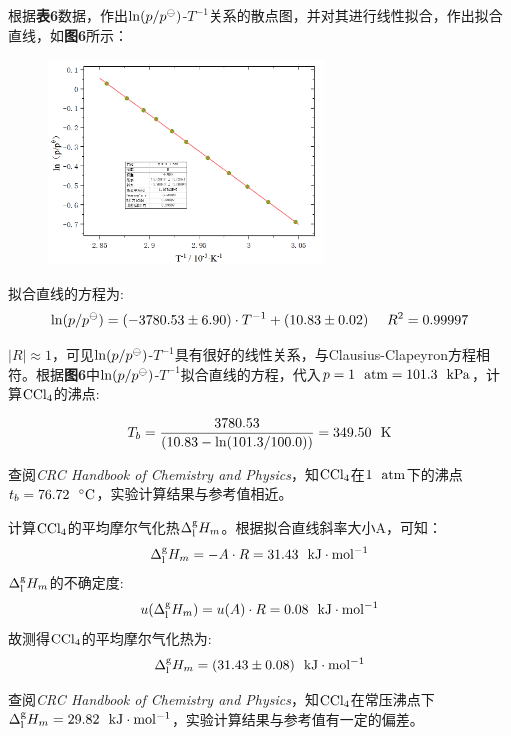 \documentclass[12pt]{article}
\begin{document}
		\par
		根据\textbf{表6}数据，作出${\rm ln}(p/p^{\ominus})$-$T^{-1}$关系的散点图，并对其进行线性拟合，作出拟合直线，如\textbf{图6}所示：
		\begin{figure}[!h]
			\centering
			\includegraphics[width=0.65\textwidth]{6.png}
		\end{figure}
		\par
		拟合直线的方程为:
		$$
			{\rm ln}(p/p^{\ominus})=(-3780.53\pm 6.90)\cdot T^{-1}+(10.83 \pm 0.02) \ \ \ \ R^{2}=0.99997
		$$
		\par
		$|R|\approx 1$，可见${\rm ln}(p/p^{\ominus})$-$T^{-1}$具有很好的线性关系，与Clausius-Clapeyron方程相符。根据\textbf{图6}中${\rm ln}(p/p^{\ominus})$-$T^{-1}$拟合直线的方程，代入$p=1\ \ {\rm atm}=101.3\ \ {\rm kPa}$，计算$\rm CCl_{4}$的沸点:\par
		$$
			T_{b}=\frac{3780.53}{(10.83-{\rm ln}(101.3/100.0))}=349.50\ \ {\rm K}
		$$
		\par
		查阅\textit{CRC Handbook of Chemistry and Physics}\citealp{crc}，知$\rm CCl_{4}$在$\rm 1\ \ atm$下的沸点$t_{b}=76.72\ \ {\rm ^{\circ}C}$，实验计算结果与参考值相近。\par
		计算$\rm CCl_{4}$的平均摩尔气化热$\Delta^{\rm g}_{\rm l}H_{m}$。根据拟合直线斜率大小A，可知：
		$$
			\Delta^{\rm g}_{\rm l}H_{m}=-A\cdot R=31.43\ \ {\rm kJ\cdot mol^{-1}}
		$$
		$\Delta^{\rm g}_{\rm l}H_{m}$的不确定度:
		$$
			u(\Delta^{\rm g}_{\rm l}H_{m})=u(A)\cdot R=0.08\ \ {\rm kJ\cdot mol^{-1}}
		$$
		故测得$\rm CCl_{4}$的平均摩尔气化热为:
		$$
			\Delta^{\rm g}_{\rm l}H_{m}=(31.43\pm 0.08)\ \ {\rm kJ\cdot mol^{-1}}
		$$
		\par
		查阅\textit{CRC Handbook of Chemistry and Physics}\citealp{crc}，知$\rm CCl_{4}$在常压沸点下$\Delta^{\rm g}_{\rm l}H_{m}=29.82\ \ {\rm kJ\cdot mol^{-1}}$，实验计算结果与参考值有一定的偏差。
\end{document}
